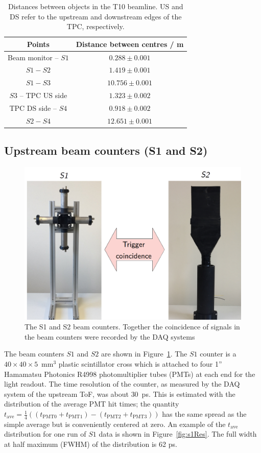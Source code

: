\begin{table}
  \centering
  \caption{Distances between objects in the T10 beamline. US and DS refer to the upstream and downstream edges of the TPC, respectively.}
  \begin{tabular}{c|c}
    \hline
    \hline
    Points & Distance between centres / m\\
    \hline
    Beam monitor -- $\mathit{S1}$ & $0.288 \pm 0.001$ \\
    $\mathit{S1}-\mathit{S2}$ & $1.419 \pm 0.001$ \\
    $\mathit{S1}-\mathit{S3}$ & $10.756 \pm 0.001$ \\
    $\mathit{S3}$ -- TPC US side & $1.323 \pm 0.002$ \\
    TPC DS side -- $\mathit{S4}$ & $0.918 \pm 0.002$ \\
    $\mathit{S2}-\mathit{S4}$ & $12.651 \pm 0.001$ \\
    \hline    
  \end{tabular}
  \label{tab:distances}
\end{table}

\subsection{Upstream beam counters (S1 and S2)}
\label{subsec:s1s2Exp}
\begin{figure}
  \centering
  \includegraphics[width=0.7\linewidth]{files/Figures/S1S2FrontOn.png}
  \caption{The S1 and S2 beam counters. Together the coincidence of signals in the beam counters were recorded by the DAQ systems}
  \label{fig:S1S2headon}
\end{figure}
The beam counters $\mathit{S1}$ and $\mathit{S2}$ are shown in Figure~\ref{fig:S1S2headon}.
The $\mathit{S1}$ counter is a $40\times40\times5$~mm$^3$ plastic scintillator cross which is attached to four 1'' Hamamatsu Photonics R4998 photomultiplier tubes (PMTs) at each end for the light readout.
The time resolution of the counter, as measured by the DAQ system of the upstream ToF, was about 30~ps. This is estimated with the distribution of the average PMT hit times; the quantity $t_{\textrm{ave}}=\frac{1}{4}((t_{\textrm{PMT0}}+t_{\textrm{PMT1}})-(t_{\textrm{PMT2}}+t_{\textrm{PMT3}}))$ has the same spread as the simple average but is conveniently centered at zero.
An example of the $t_{\textrm{ave}}$ distribution for one run of $\mathit{S1}$ data is shown in Figure~\ref{fig:s1Res}. The full width at half maximum (FWHM) of the distribution is 62 ps.

